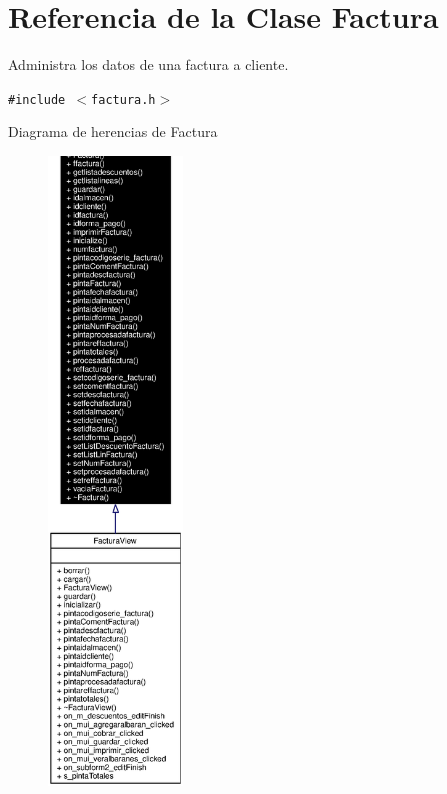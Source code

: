 \section{Referencia de la Clase Factura}
\label{classFactura}
Administra los datos de una factura a cliente.  


{\tt \#include $<$factura.h$>$}

Diagrama de herencias de Factura\begin{figure}[H]
\begin{center}
\leavevmode
\includegraphics[width=101pt]{classFactura__inherit__graph}
\end{center}
\end{figure}
